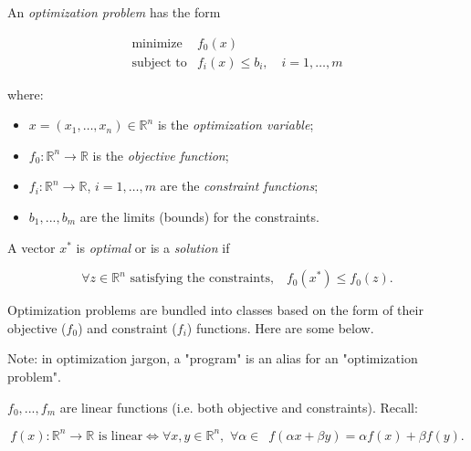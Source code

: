 


An \textit{optimization problem} has the form

\begin{equation*}
	\begin{array}{rl}
	\text{minimize} & f_0(x) \\
	\text{subject to} & f_i(x)\le b_i,\quad i=1,\ldots,m
	\end{array}
\end{equation*}

where:

\begin{itemize}
	\item $x=(x_1,\ldots,x_n)\in\mathbb R^n$ is the \textit{optimization variable};
	\item $f_0:\mathbb R^n\to\mathbb R$ is the \textit{objective function};
	\item $f_i:\mathbb R^n\to \mathbb R$, $i=1,\ldots,m$ are the \textit{constraint functions};
	\item $b_1,...,b_m$ are the limits (bounds) for the constraints.
\end{itemize}

A vector $x^*$ is \textit{optimal} or is a \textit{solution} if

\begin{equation*}
	\forall z\in\mathbb R^n\text{ satisfying the constraints,}\quad f_0(x^*)\le f_0(z).
\end{equation*}


Optimization problems are bundled into classes based on the form of their objective ($f_0$) and constraint ($f_i$) functions. Here are some below.

\begin{Fact}
	Note: in optimization jargon, a "program" is an alias for an "optimization problem".
\end{Fact}


$f_0,...,f_m$ are linear functions (i.e. both objective and constraints). Recall:

$$
f(x):\mathbb R^n\to\mathbb R\text{ is linear}\Leftrightarrow \forall x,y\in\mathbb R^n,\,\,\forall\alpha\in\mathbb \,\,\, f(\alpha x+\beta y)=\alpha f(x)+\beta f(y).
$$


